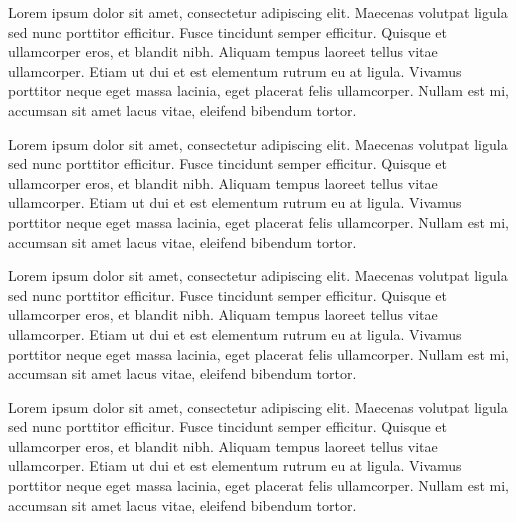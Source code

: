 Lorem ipsum dolor sit amet, consectetur adipiscing elit. Maecenas volutpat ligula sed nunc porttitor efficitur. Fusce tincidunt semper efficitur. Quisque et ullamcorper eros, et blandit nibh. Aliquam tempus laoreet tellus vitae ullamcorper. Etiam ut dui et est elementum rutrum eu at ligula. Vivamus porttitor neque eget massa lacinia, eget placerat felis ullamcorper. Nullam est mi, accumsan sit amet lacus vitae, eleifend bibendum tortor.\par
Lorem ipsum dolor sit amet, consectetur adipiscing elit. Maecenas volutpat ligula sed nunc porttitor efficitur. Fusce tincidunt semper efficitur. Quisque et ullamcorper eros, et blandit nibh. Aliquam tempus laoreet tellus vitae ullamcorper. Etiam ut dui et est elementum rutrum eu at ligula. Vivamus porttitor neque eget massa lacinia, eget placerat felis ullamcorper. Nullam est mi, accumsan sit amet lacus vitae, eleifend bibendum tortor.\par
Lorem ipsum dolor sit amet, consectetur adipiscing elit. Maecenas volutpat ligula sed nunc porttitor efficitur. Fusce tincidunt semper efficitur. Quisque et ullamcorper eros, et blandit nibh. Aliquam tempus laoreet tellus vitae ullamcorper. Etiam ut dui et est elementum rutrum eu at ligula. Vivamus porttitor neque eget massa lacinia, eget placerat felis ullamcorper. Nullam est mi, accumsan sit amet lacus vitae, eleifend bibendum tortor.\par
Lorem ipsum dolor sit amet, consectetur adipiscing elit. Maecenas volutpat ligula sed nunc porttitor efficitur. Fusce tincidunt semper efficitur. Quisque et ullamcorper eros, et blandit nibh. Aliquam tempus laoreet tellus vitae ullamcorper. Etiam ut dui et est elementum rutrum eu at ligula. Vivamus porttitor neque eget massa lacinia, eget placerat felis ullamcorper. Nullam est mi, accumsan sit amet lacus vitae, eleifend bibendum tortor.\par